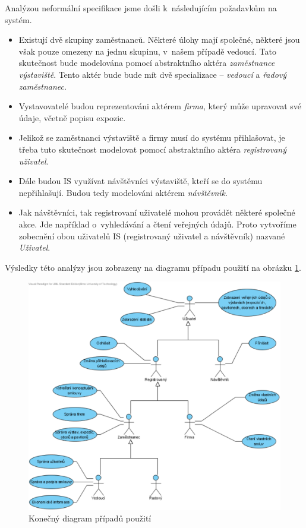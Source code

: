 Analýzou neformální specifikace jsme došli k~následujícím požadavkům na systém.

\begin{itemize}
	\item Existují dvě skupiny zaměstnanců. Některé úlohy mají společné,
	některé jsou však pouze omezeny na jednu skupinu, v~našem případě vedoucí.
	Tato skutečnost bude modelována pomocí abstraktního aktéra
	\emph{zaměstnance výstaviště}. Tento aktér bude bude mít dvě specializace
	-- \emph{vedoucí} a \emph{řadový zaměstnanec}.

	\item Vystavovatelé budou reprezentováni aktérem \emph{firma}, který může
	upravovat své údaje, včetně popisu expozic.

	\item Jelikož se zaměstnanci výstaviště a firmy musí do systému
	přihlašovat, je třeba tuto skutečnost modelovat pomocí abstraktního aktéra
	\emph{registrovaný uživatel}.

	\item Dále budou IS využívat návštěvníci výstaviště, kteří se do systému
	nepřihlašují. Budou tedy modelováni aktérem \emph{návštěvník}.

	\item Jak návštěvníci, tak registrovaní uživatelé mohou provádět některé
	společné akce. Jde například o~vyhledávání a čtení veřejných údajů. Proto
	vytvoříme zobecnění obou uživatelů IS (registrovaný uživatel a návštěvník)
	nazvané \emph{Uživatel}.
\end{itemize}

Výsledky této analýzy jsou zobrazeny na diagramu případu použití na obrázku
\ref{fig:UseCaseStage3}.

\begin{figure}[h]
	\begin{center}
		\includegraphics[width=12.5cm,keepaspectratio]{include/use_case_stage3}
	\end{center}
	\caption{Konečný diagram případů použití}
	\label{fig:UseCaseStage3}
\end{figure}

